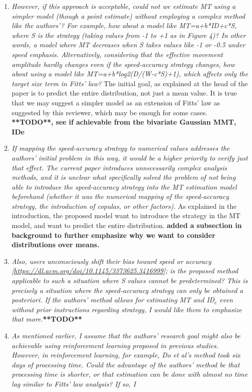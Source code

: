 \documentclass{article}
\begin{document}
\begin{enumerate}
    \item \textit{However, if this approach is acceptable, could not we estimate MT using a simpler model (though a point estimate) without employing a complex method like the authors'? For example, how about a model like MT=a+b*ID+c*S, where S is the strategy (taking values from -1 to +1 as in Figure 4)? In other words, a model where MT decreases when S takes values like -1 or -0.5 under speed emphasis. Alternatively, considering that the effective movement amplitude hardly changes even if the speed-accuracy strategy changes, how about using a model like MT=a+b*log2(D/(W-c*S)+1), which affects only the target size term in Fitts' law?} The initial goal, as explained at the head of the paper is to predict the entire distribution, not just a mean value. It is true that we may suggest a simpler model as an extension of Fitts' law as suggested by this reviewer, which may be enough for some cases. \textbf{**TODO**, see if achievable from the bivariate Gaussian MMT, IDe}
    \item \textit{If mapping the speed-accuracy strategy to numerical values addresses the authors' initial problem in this way, it would be a higher priority to verify just that effect. The current paper introduces unnecessarily complex analysis methods, and it is unclear what specifically solved the problem of not being able to introduce the speed-accuracy strategy into the MT estimation model beforehand (whether it was the numerical mapping of the speed-accuracy strategy, the introduction of copulas, or other factors).} As explained in the introduction, the proposed model want to introduce the strategy in the MT model, and want to predict the entire distribution. \textbf{added a subsection in background to further emphasize why we want to consider distributions over means.}
    \item \textit{Also, users unconsciously shift their bias toward speed or accuracy [\url{https://dl.acm.org/doi/10.1145/3373625.3416999}]; is the proposed method applicable to such a situation where S values cannot be
    predetermined? This is precisely a situation where the speed-accuracy
    strategy can only be obtained a posteriori. If the authors' method
    allows for estimating MT and ID$_e$ even without prior instructions
    regarding strategy, I would like them to emphasize that more.}\textbf{**TODO**}
    \item \textit{As mentioned earlier, I assume that the authors' research goal might also be achievable using reinforcement learning proposed in previous studies. However, in reinforcement learning, for example, Do et al's method took six days of processing time. Could the advantage of the authors' method be that processing time is shorter, or that estimation can be done with almost no time lag similar to Fitts' law analysis? If so, I
}
\end{enumerate}
\end{document}
